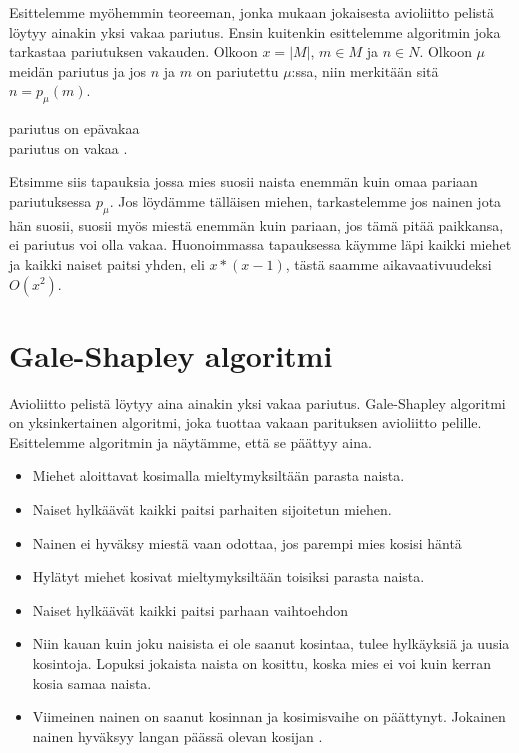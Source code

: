 \documentclass[finnish]{tktltiki2}
\theoremstyle{definition}
\theoremstyle{remark}
\begin{document}
Esittelemme myöhemmin teoreeman, jonka mukaan jokaisesta avioliitto pelistä löytyy ainakin yksi vakaa pariutus. Ensin kuitenkin esittelemme algoritmin joka tarkastaa pariutuksen vakauden.
Olkoon $x = |M|$, $m \in M$ ja $n \in N$. Olkoon $\mu$ meidän pariutus ja jos $n$ ja $m$ on pariutettu $\mu$:ssa, niin merkitään sitä $n = p_\mu(m)$.
\begin{algorithmic}
				\State \Return pariutus on epävakaa
			\EndIf
		\EndFor
	\EndFor\\
	\Return pariutus on vakaa
	\cite[p. 8]{gusfield1989stable}.
\end{algorithmic}

Etsimme siis tapauksia jossa mies suosii naista enemmän kuin omaa pariaan pariutuksessa $p_\mu$.
Jos löydämme tälläisen miehen, tarkastelemme jos nainen jota hän suosii, suosii myös miestä enemmän kuin pariaan, jos tämä pitää paikkansa, ei pariutus voi olla vakaa.
Huonoimmassa tapauksessa käymme läpi kaikki miehet ja kaikki naiset paitsi yhden, eli $x*(x-1)$, tästä saamme aikavaativuudeksi $O(x^2)$.

\section{Gale-Shapley algoritmi}
Avioliitto pelistä löytyy aina ainakin yksi vakaa pariutus. Gale-Shapley algoritmi on yksinkertainen algoritmi, joka tuottaa vakaan parituksen avioliitto pelille. Esittelemme algoritmin ja näytämme, että se päättyy aina.
\begin{itemize}
	\item Miehet aloittavat kosimalla mieltymyksiltään parasta naista.
	\item Naiset hylkäävät kaikki paitsi parhaiten sijoitetun miehen.
	\item Nainen ei hyväksy miestä vaan odottaa, jos parempi mies kosisi häntä
	\item Hylätyt miehet kosivat mieltymyksiltään toisiksi parasta naista.
	\item Naiset hylkäävät kaikki paitsi parhaan vaihtoehdon
	\item Niin kauan kuin joku naisista ei ole saanut kosintaa, tulee hylkäyksiä ja uusia kosintoja. Lopuksi jokaista naista on kosittu, koska mies ei voi kuin kerran kosia samaa naista.
	\item Viimeinen nainen on saanut kosinnan ja kosimisvaihe on päättynyt. Jokainen nainen hyväksyy langan päässä olevan kosijan \cite[p. 13]{gale62a}.
\end{itemize}
\end{document}
